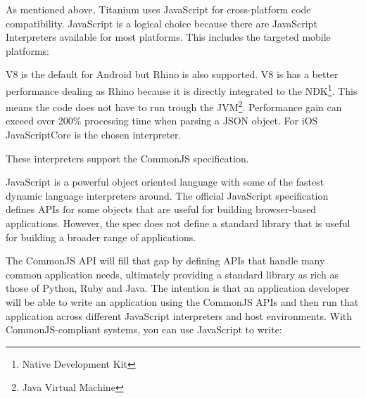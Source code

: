 

As mentioned above, Titanium uses JavaScript for cross-platform code compatibility. JavaScript is a logical choice because there are JavaScript Interpreters available for most platforms. This includes the targeted mobile platforms:

V8 is the default for Android but Rhino is also supported. V8 is has a better performance dealing as Rhino because it is directly integrated to the NDK\footnote{Native Development Kit}. This means the code does not have to run trough the JVM\footnote{Java Virtual Machine}. Performance gain can exceed over 200\% processing time when parsing a JSON object.\cite{Lukasavage2011}
For iOS JavaScriptCore is the chosen interpreter.

These interpreters support the CommonJS specification.


JavaScript is a powerful object oriented language with some of the fastest dynamic language interpreters around. The official JavaScript specification defines APIs for some objects that are useful for building browser-based applications. However, the spec does not define a standard library that is useful for building a broader range of applications.

The CommonJS API will fill that gap by defining APIs that handle many common application needs, ultimately providing a standard library as rich as those of Python, Ruby and Java. The intention is that an application developer will be able to write an application using the CommonJS APIs and then run that application across different JavaScript interpreters and host environments. With CommonJS-compliant systems, you can use JavaScript to write:

